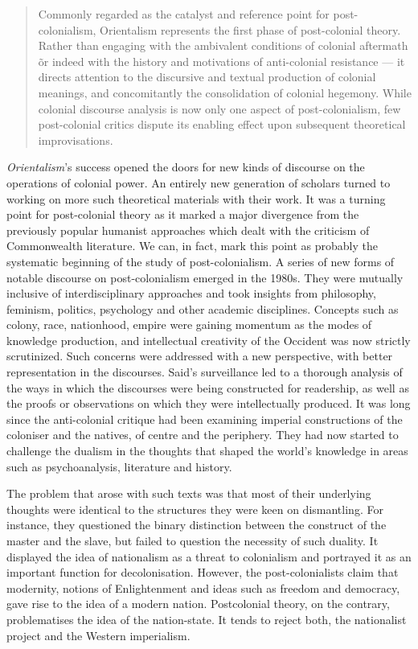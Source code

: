 \begin{quote}
 Commonly regarded as the catalyst and reference point for post-colonialism, Orientalism represents the first phase of post-colonial theory. Rather than engaging with the ambivalent conditions of colonial aftermath \~ or indeed with the history and motivations of anti-colonial resistance — it directs attention to the discursive and textual production of colonial meanings, and concomitantly the consolidation of colonial hegemony. While colonial discourse analysis is now only one aspect of post-colonialism, few post-colonial critics dispute its enabling effect upon subsequent theoretical improvisations. \parencite{Gandhi1998}
\end{quote}

\emph{Orientalism}’s success opened the doors for new kinds of discourse on the operations of colonial power. An entirely new generation of scholars turned to working on more such theoretical materials with their work. It was a turning point for post-colonial theory as it marked a major divergence from the previously popular humanist approaches which dealt with the criticism of Commonwealth literature. We can, in fact, mark this point as probably the systematic beginning of the study of post-colonialism. A series of new forms of notable discourse on post-colonialism emerged in the 1980s. They were mutually inclusive of interdisciplinary approaches and took insights from philosophy, feminism, politics, psychology and other academic disciplines. Concepts such as colony, race, nationhood, empire were gaining momentum as the modes of knowledge production, and intellectual creativity of the Occident was now strictly scrutinized. Such concerns were addressed with a new perspective, with better representation in the discourses. Said’s surveillance led to a thorough analysis of the ways in which the discourses were being constructed for readership, as well as the proofs or observations on which they were intellectually produced. It was long since the anti-colonial critique had been examining imperial constructions of the \linebreak coloniser and the natives, of centre and the periphery. They had now started to challenge the dualism in the thoughts that shaped the world’s knowledge in areas such as psychoanalysis, literature and history.

The problem that arose with such texts was that most of their underlying thoughts were identical to the structures they were keen on dismantling. For instance, they questioned the binary distinction between the construct of the master and the slave, but failed to question the necessity of such duality. It displayed the idea of nationalism as a threat to colonialism and portrayed it as an important function for decolonisation. However, the post-colonialists claim that modernity, notions of Enlightenment and ideas such as freedom and democracy, gave rise to the idea of a modern nation. Postcolonial theory, on the contrary, problematises the idea of the nation-state. It tends to reject both, the nationalist project and the Western imperialism.

